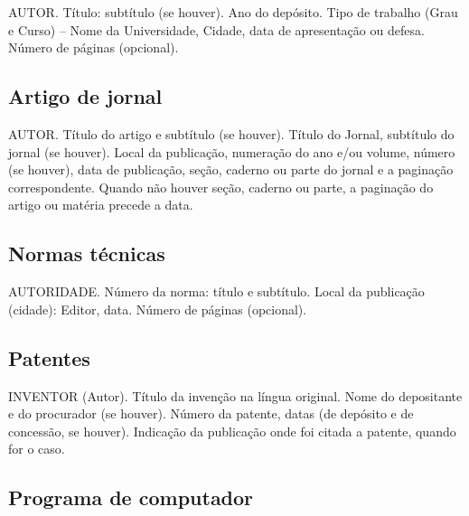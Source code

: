 AUTOR. Título: subtítulo (se houver). Ano do depósito. Tipo de trabalho (Grau e Curso) -- Nome da Universidade, Cidade, data de apresentação ou defesa. Número de páginas (opcional).




\subsection{Artigo de jornal}

AUTOR. Título do artigo e subtítulo (se houver). Título do Jornal, subtítulo do jornal (se houver). Local da publicação, numeração do ano e/ou volume, número (se houver), data de publicação, seção, caderno ou parte do jornal e a paginação correspondente. Quando não houver seção, caderno ou parte, a paginação do artigo ou matéria precede a data.



\subsection{Normas técnicas}

AUTORIDADE. Número da norma: título e subtítulo. Local da publicação (cidade): Editor, data. Número de páginas (opcional).




\subsection{Patentes}

INVENTOR (Autor). Título da invenção na língua original. Nome do depositante e do procurador (se houver). Número da patente, datas (de depósito e de concessão, se houver). Indicação da publicação onde foi citada a patente, quando for o caso.



\subsection{Programa de computador}

